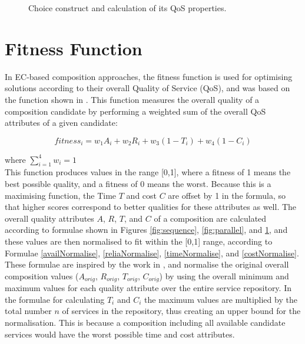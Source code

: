 \begin{figure}
\centerline{
}
\caption{Choice construct and calculation of its QoS properties.}
\label{fig:conditional}
\end{figure}

\section{Fitness Function}
In EC-based composition approaches, the fitness function is used for optimising solutions according to their overall Quality of Service (QoS), and was based on the function shown in \cite{sawczuk2015gp}. This function measures the overall quality of a composition candidate by performing a weighted sum of the overall QoS attributes of a given candidate:

\begin{equation}
 fitness_i = w_1A_i + w_2R_i + w_3(1 - T_i) + w_4(1 - C_i)
\end{equation}

where $\sum_{i=1}^4{w_i} = 1$ \\

This function produces values in the range [0,1], where a fitness of 1 means the best possible quality, and a fitness of 0 means the worst. Because this is a maximising function, the Time $T$ and cost $C$ are offset by 1 in the formula, so that higher scores correspond to better qualities for these attributes as well. The overall quality attributes $A$, $R$, $T$, and $C$ of a composition are calculated according to formulae shown in Figures \ref{fig:sequence}, \ref{fig:parallel}, and \ref{fig:conditional}, and these values are then normalised to fit within the [0,1] range, according to Formulae \ref{availNormalise}, \ref{reliaNormalise}, \ref{timeNormalise}, and \ref{costNormalise}. These formulae are inspired by the work in \cite{ma2015hybrid}, and normalise the original overall composition values ($A_{orig}$, $R_{orig}$, $T_{orig}$, $C_{orig}$) by using the overall minimum and maximum values for each quality attribute over the entire service repository. In the formulae for calculating $T_i$ and $C_i$ the maximum values are multiplied by the total number $n$ of services in the repository, thus creating an upper bound for the normalisation. This is because a composition including all available candidate services would have the worst possible time and cost attributes.


